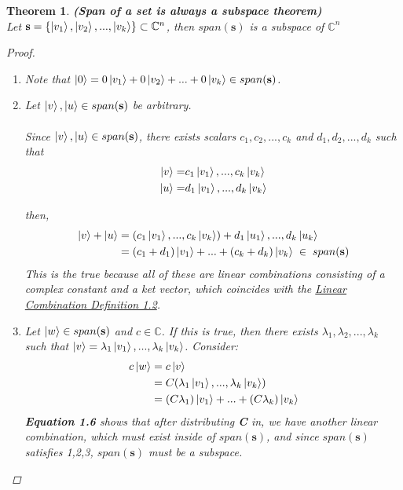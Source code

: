 \documentclass[12pt]{article}
\theoremstyle{plain}
\newtheorem{theorem}[lemma]{Theorem}
\theoremstyle{nonumberplain}
\theoremstyle{plain}
\theoremstyle{nonumberplain}
\newtheorem{proof}{Proof.}
\newcommand\1{{\bf 1}}
\newcommand{\C}{\mathbb{C}} %
\newcommand{\<}{\left\langle}
\renewcommand{\>}{\right\rangle}
\begin{document}
\begin{theorem}
\textbf{(Span of a set is always a subspace theorem)}\\
Let $\mathbf{s} = \{ \ket{v_1}, \ket{v_2}, ... , \ket{v_k} \} \subset \C^n$, then $span(\mathbf{s})$ is a subspace of $\C^n$
\\
\begin{proof} \renewcommand{\qedsymbol}{}
\begin{enumerate}
\item Note that $\ket{0} = 0\ket{v_1} + 0\ket{v_2}  + ... + 0\ket{v_k} \in span(\mathbf{s})$. 
\item Let $\ket{v}, \ket{u} \in span(\mathbf{s})$ be arbitrary. \\
\\ 
Since  $\ket{v}, \ket{u} \in span(\mathbf{s})$, there exists scalars $c_1, c_2, ... , c_k$ and $d_1, d_2, ... , d_k$ such that 
\begin{align*}
\ket{v} = &c_1\ket{v_1}, ... ,  c_k\ket{v_k} \\
\ket{u} = &d_1\ket{v_1}, ... ,  d_k\ket{v_k}
\end{align*}

then, 
\begin{align*}
\ket{v} + \ket{u} &= (c_1\ket{v_1}, ... ,  c_k\ket{v_k}) +   d_1\ket{u_1}, ... ,  d_k\ket{u_k}\\
 &= (c_1 + d_1)\ket{v_1} + ... + (c_k + d_k)\ket{v_k}\; \in\; span(\mathbf{s})
\end{align*}
This is the true because all of these are linear combinations consisting of a complex constant and a ket vector, which coincides with the \hyperref[def:Combination]{Linear Combination Definition 1.2}.\\
\item Let $\ket{w} \in span(\mathbf{s})$ and $c \in \C$.
If this is true, then there exists $\lambda_1, \lambda_2, ... , \lambda_k$ such that $\ket{v} = \lambda_1\ket{v_1}, ... ,  \lambda_k\ket{v_k}$.  Consider: 
\begin{equation} 
\begin{split}
c\ket{w} &= c\ket{v} \\
&= C(\lambda_1\ket{v_1}, ... ,  \lambda_k\ket{v_k}) \\
&= (C\lambda_1)\ket{v_1} + ... + (C\lambda_k)\ket{v_k}
\end{split}
\end{equation}
\textbf{Equation 1.6} shows that after distributing \textbf{C} in, we have another linear combination, which must exist inside of $span(\mathbf{s})$, and since $span(\mathbf{s})$ satisfies 1,2,3, $span(\mathbf{s})$ must be a subspace.
\end{enumerate}
\end{proof}
\end{theorem}
\end{document}
